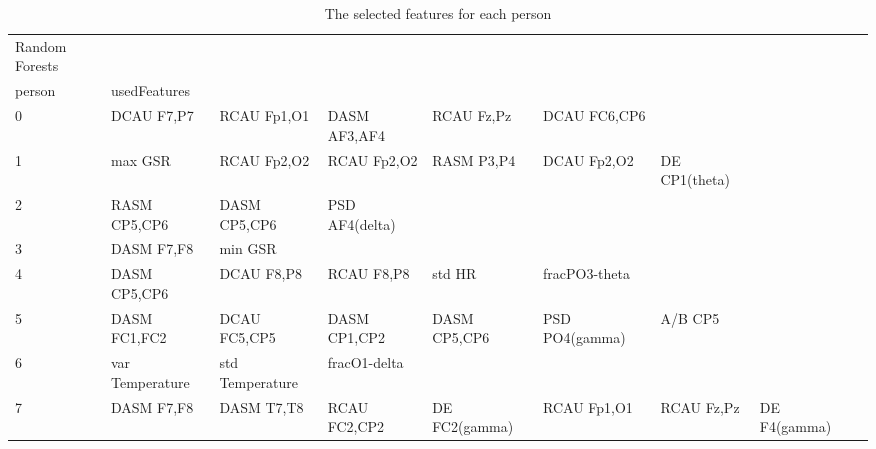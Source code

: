 \clearpage
\begin{landscape}
\begin{table}[]
\centering
\caption{The selected features for each person}
\begin{tabular}{l|llllllll}
Random Forests     &                      &                         &                      &                    &                       &                      &                 &                 \\
person             & usedFeatures         &                         &                      &                    &                       &                      &                 &                 \\
0                  & DCAU F7,P7           & RCAU Fp1,O1             & DASM AF3,AF4         & RCAU Fz,Pz         & DCAU FC6,CP6          &                      &                 &                 \\
1                  & max GSR              & RCAU Fp2,O2             & RCAU Fp2,O2          & RASM P3,P4         & DCAU Fp2,O2           & DE CP1(theta)        &                 &                 \\
2                  & RASM CP5,CP6         & DASM CP5,CP6            & PSD AF4(delta)       &                    &                       &                      &                 &                 \\
3                  & DASM F7,F8           & min GSR                 &                      &                    &                       &                      &                 &                 \\
4                  & DASM CP5,CP6         & DCAU F8,P8              & RCAU F8,P8           & std HR             & fracPO3-theta         &                      &                 &                 \\
5                  & DASM FC1,FC2         & DCAU FC5,CP5            & DASM CP1,CP2         & DASM CP5,CP6       & PSD PO4(gamma)        & A/B CP5              &                 &                 \\
6                  & var Temperature      & std Temperature         & fracO1-delta         &                    &                       &                      &                 &                 \\
7                  & DASM F7,F8           & DASM T7,T8              & RCAU FC2,CP2         & DE FC2(gamma)      & RCAU Fp1,O1           & RCAU Fz,Pz           & DE F4(gamma)    &                 \\

\end{tabular}
\end{table}
\end{landscape}
